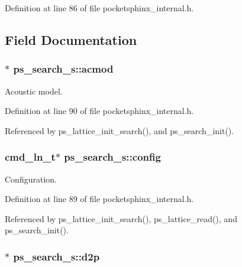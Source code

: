 Definition at line 86 of file pocketsphinx\-\_\-internal.\-h.



\subsection{Field Documentation}
\subsubsection[{acmod}]{$\ast$ ps\-\_\-search\-\_\-s\-::acmod}\label{structps__search__s_a0fdf6fe8c4d9c28f10c48c09517c6b91}


Acoustic model. 



Definition at line 90 of file pocketsphinx\-\_\-internal.\-h.



Referenced by ps\-\_\-lattice\-\_\-init\-\_\-search(), and ps\-\_\-search\-\_\-init().

\subsubsection[{config}]{\setlength{\rightskip}{0pt plus 5cm}cmd\-\_\-ln\-\_\-t$\ast$ ps\-\_\-search\-\_\-s\-::config}\label{structps__search__s_aa6e3e18165bbc70084a06575d5703042}


Configuration. 



Definition at line 89 of file pocketsphinx\-\_\-internal.\-h.



Referenced by ps\-\_\-lattice\-\_\-init\-\_\-search(), ps\-\_\-lattice\-\_\-read(), and ps\-\_\-search\-\_\-init().

\subsubsection[{d2p}]{$\ast$ ps\-\_\-search\-\_\-s\-::d2p}\label{structps__search__s_a81b461e7ef3a080d046039e186134a15}


